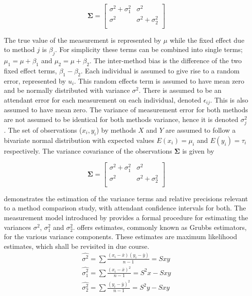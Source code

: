 \documentclass[12pt, a4paper]{report}
\theoremstyle{plain}
\theoremstyle{definition}
\theoremstyle{remark}
\begin{document}
		\[
		\boldsymbol{\Sigma} = \left[
		\begin{array}{cc}
		\sigma^{2} + \sigma^{2}_{1} & \sigma^{2} \\
		\sigma^{2} & \sigma^{2} + \sigma^{2}_{2} \\
		\end{array}
		\right]
		\]
		
	\bigskip
	The true value of the measurement is represented by $\mu$ while the fixed effect due to method $j$ is $\beta_{j}$.
	For simplicity these terms can be combined into single terms; $\mu_{1} = \mu+ \beta_{1}$ and $\mu_{2} = \mu + \beta_{2}$. The inter-method bias is the difference of the two fixed effect terms, $\beta_{1}-\beta_{2}$. Each individual is assumed to give rise to a random error, represented by $u_{i}$. This random effects term is assumed to have mean zero and be normally distributed with variance $\sigma^2$. There is assumed to be an attendant error for each measurement on each individual, denoted $\epsilon_{ij}$. This is also assumed to have mean zero. The variance of measurement error for both methods are not assumed to be identical for both methods variance,  hence it is denoted $\sigma^2_{j}$. The set of observations ($x_{i},y_{i}$) by methods $X$ and $Y$ are assumed to follow a bivariate normal distribution with expected values $E(x_{i})= \mu_{i}$ and $E(y_{i})= \tau_{i}$ respectively. The variance covariance of the observations $\boldsymbol{\Sigma}$ is given by
	
	\[
	\boldsymbol{\Sigma} = \left[
	\begin{array}{cc}
	\sigma^{2} + \sigma^{2}_{1} & \sigma^{2} \\
	\sigma^{2} & \sigma^{2} + \sigma^{2}_{2} \\
	\end{array}
	\right]
	\] 
	
	\citet{Kinsella} demonstrates the estimation of the variance terms and relative precisions relevant to a method comparison study, with attendant confidence intervals for both. The measurement model introduced by \citet{Grubbs48,Grubbs73} provides a formal procedure for estimating the variances $\sigma^2$, $\sigma^2_{1}$ and $\sigma^2_{2}$. \citet{Grubbs48} offers estimates, commonly known as Grubbs estimators, for the various variance components. These estimates are maximum likelihood estimates, which shall be revisited in due course.
	\begin{eqnarray*}
		\hat{\sigma^{2}} = \sum{\frac{(x_{i}-\bar{x})(y_{i}-\bar{y})}{n-1}} = Sxy\\
		\hat{\sigma^{2}_{1}} = \sum{\frac{(x_{i}-\bar{x})^{2}}{n-1}} =S^{2}x - Sxy  \\
		\hat{\sigma^{2}_{2}} =
		\sum{\frac{(y_{i}-\bar{y})^{2}}{n-1}} = S^{2}y - Sxy
	\end{eqnarray*}
	
\end{document}
